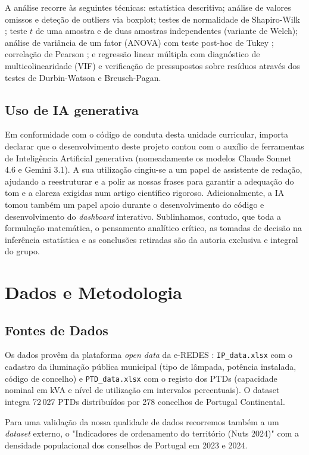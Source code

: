 \documentclass[conference]{IEEEtran}
\begin{document}
A análise recorre às seguintes técnicas: estatística descritiva; análise de valores omissos e deteção de outliers via boxplot; testes de normalidade de Shapiro-Wilk \cite{b8}; teste $t$ de uma amostra e de duas amostras independentes (variante de Welch); análise de variância de um fator (ANOVA) \cite{b2} com teste post-hoc de Tukey \cite{b9}; correlação de Pearson \cite{b7}; e regressão linear múltipla com diagnóstico de multicolinearidade (VIF) e verificação de pressupostos sobre resíduos através dos testes de Durbin-Watson \cite{b13} e Breusch-Pagan. \cite{b12}

\subsection{Uso de IA generativa}
Em conformidade com o código de conduta desta unidade curricular, importa declarar que o desenvolvimento deste projeto contou com o auxílio de ferramentas de Inteligência Artificial generativa (nomeadamente os modelos Claude Sonnet 4.6 e Gemini 3.1). A sua utilização cingiu-se a um papel de assistente de redação, ajudando a reestruturar e a polir as nossas frases para garantir a adequação do tom e a clareza exigidas num artigo científico rigoroso. Adicionalmente, a IA tomou também um papel apoio durante o desenvolvimento do código e desenvolvimento do \textit{dashboard} interativo. Sublinhamos, contudo, que toda a formulação matemática, o pensamento analítico crítico, as tomadas de decisão na inferência estatística e as conclusões retiradas são da autoria exclusiva e integral do grupo.


\section{Dados e Metodologia}

\subsection{Fontes de Dados}

Os dados provêm da plataforma \textit{open data} da e-REDES \cite{b4}: \texttt{IP\_data.xlsx} com o cadastro da iluminação pública municipal (tipo de lâmpada, potência instalada, código de concelho) e \texttt{PTD\_data.xlsx} com o registo dos PTDs (capacidade nominal em kVA e nível de utilização em intervalos percentuais). O dataset integra 72\,027 PTDs distribuídos por 278 concelhos de Portugal Continental.

Para uma validação da nossa qualidade de dados recorremos também a um \textit{dataset} externo, o "Indicadores de ordenamento do território (Nuts 2024)" com a densidade populacional dos conselhos de Portugal em 2023 e 2024. \cite{b11}
\end{document}
